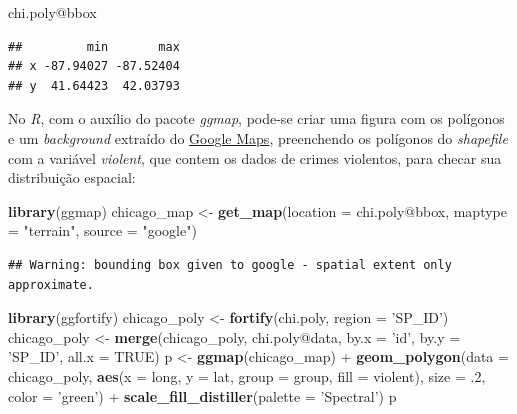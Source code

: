 \documentclass[12pt,]{article}
\newenvironment{Shaded}{\begin{snugshade}}{\end{snugshade}}
\newcommand{\KeywordTok}[1]{\textcolor[rgb]{0.13,0.29,0.53}{\textbf{{#1}}}}
\newcommand{\DataTypeTok}[1]{\textcolor[rgb]{0.13,0.29,0.53}{{#1}}}
\newcommand{\DecValTok}[1]{\textcolor[rgb]{0.00,0.00,0.81}{{#1}}}
\newcommand{\StringTok}[1]{\textcolor[rgb]{0.31,0.60,0.02}{{#1}}}
\newcommand{\OtherTok}[1]{\textcolor[rgb]{0.56,0.35,0.01}{{#1}}}
\newcommand{\NormalTok}[1]{{#1}}
\begin{document}
\begin{Shaded}
\begin{Highlighting}[]
\NormalTok{chi.poly@bbox}
\end{Highlighting}
\end{Shaded}

\begin{verbatim}
##         min       max
## x -87.94027 -87.52404
## y  41.64423  42.03793
\end{verbatim}

No \emph{R}, com o auxílio do pacote \emph{ggmap}, pode-se criar uma
figura com os polígonos e um \emph{background} extraído do
\href{https://www.google.com.br/maps}{Google Maps}, preenchendo os
polígonos do \emph{shapefile} com a variável \emph{violent}, que contem
os dados de crimes violentos, para checar sua distribuição espacial:

\begin{Shaded}
\begin{Highlighting}[]
\KeywordTok{library}\NormalTok{(ggmap)}
\NormalTok{chicago_map <-}\StringTok{ }\KeywordTok{get_map}\NormalTok{(}\DataTypeTok{location =} \NormalTok{chi.poly@bbox, }\DataTypeTok{maptype =} \StringTok{"terrain"}\NormalTok{,}
                       \DataTypeTok{source =} \StringTok{"google"}\NormalTok{)}
\end{Highlighting}
\end{Shaded}

\begin{verbatim}
## Warning: bounding box given to google - spatial extent only approximate.
\end{verbatim}

\begin{Shaded}
\begin{Highlighting}[]
\KeywordTok{library}\NormalTok{(ggfortify)}
\NormalTok{chicago_poly <-}\StringTok{ }\KeywordTok{fortify}\NormalTok{(chi.poly, }\DataTypeTok{region =} \StringTok{'SP_ID'}\NormalTok{)}
\NormalTok{chicago_poly <-}\StringTok{ }\KeywordTok{merge}\NormalTok{(chicago_poly, chi.poly@data, }\DataTypeTok{by.x =} \StringTok{'id'}\NormalTok{,}
                      \DataTypeTok{by.y =} \StringTok{'SP_ID'}\NormalTok{, }\DataTypeTok{all.x =} \OtherTok{TRUE}\NormalTok{)}
\NormalTok{p <-}\StringTok{ }\KeywordTok{ggmap}\NormalTok{(chicago_map) +}\StringTok{ }\KeywordTok{geom_polygon}\NormalTok{(}\DataTypeTok{data =} \NormalTok{chicago_poly,}
                                       \KeywordTok{aes}\NormalTok{(}\DataTypeTok{x =} \NormalTok{long, }\DataTypeTok{y =} \NormalTok{lat, }\DataTypeTok{group =} \NormalTok{group, }\DataTypeTok{fill =} \NormalTok{violent),}
                                       \DataTypeTok{size =} \NormalTok{.}\DecValTok{2}\NormalTok{, }\DataTypeTok{color =} \StringTok{'green'}\NormalTok{) +}\StringTok{ }
\StringTok{      }\KeywordTok{scale_fill_distiller}\NormalTok{(}\DataTypeTok{palette =} \StringTok{'Spectral'}\NormalTok{)}
\NormalTok{p}
\end{Highlighting}
\end{Shaded}
\end{document}
